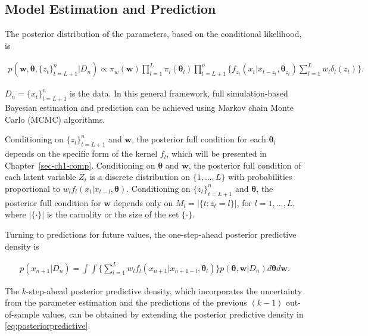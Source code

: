 \documentclass[
  letterpaper,
  double,
  12pt,
  1.0in]{beavtex}
\begin{document}
\subsection{Model Estimation and
Prediction}\label{estimationvalidationprediction}

The posterior distribution of the parameters, based on the conditional
likelihood, is

\begin{equation}
\begin{split}
p(\boldsymbol{w}, \boldsymbol{\theta}, {\{z_t\}}_{t=L+1}^n | D_n) \propto \pi_w(\boldsymbol{w}) \prod_{l=1}^L \pi_l(\boldsymbol{\theta}_l) 
\prod_{t=L+1}^n \Biggl\{ f_{z_t} (x_t | x_{t-z_t}, \boldsymbol{\theta}_{z_t}) \sum_{l=1}^L w_l \delta_l(z_t) \Biggl\}.
\end{split}
\end{equation}

\(D_n = {\{x_t\}}_{t=L+1}^n\) is the data. In this general framework,
full simulation-based Bayesian estimation and prediction can be achieved
using Markov chain Monte Carlo (MCMC) algorithms.

Conditioning on \({\{z_t\}}_{t=L+1}^n\) and \(\boldsymbol{w}\), the
posterior full condition for each \(\boldsymbol{\theta}_l\) depends on
the specific form of the kernel \(f_l\), which will be presented in
Chapter~\ref{sec-ch1-comp}. Conditioning on \(\boldsymbol{\theta}\) and
\(\boldsymbol{w}\), the posterior full condition of each latent variable
\(Z_t\) is a discrete distribution on \(\{1, ..., L\}\) with
probabilities proportional to
\(w_l f_l(x_t | x_{t-l}, \boldsymbol{\theta})\). Conditioning on
\({\{z_t\}}_{t=L+1}^n\) and \(\boldsymbol{\theta}\), the posterior full
condition for \(\boldsymbol{w}\) depends only on
\(M_l = |\{ t: z_t = l \}|\), for \(l = 1,..., L\), where
\(|\{ \cdot \}|\) is the carnality or the size of the set
\(\{ \cdot \}\).

Turning to predictions for future values, the one-step-ahead posterior
predictive density is

\begin{equation}
\begin{split}
\label{eq:posteriorpredictive}
p(x_{n+1} | D_n) = \int \int \Biggl\{ \sum_{l=1}^L w_l f_l (x_{n+1} | x_{n + 1 - l}, \boldsymbol{\theta}_l) \Biggl\} 
p(\boldsymbol{\theta} , \boldsymbol{w} | D_n) d \boldsymbol{\theta} d \boldsymbol{w}.
\end{split}
\end{equation}

The \(k\)-step-ahead posterior predictive density, which incorporates
the uncertainty from the parameter estimation and the predictions of the
previous \((k-1)\) out-of-sample values, can be obtained by extending
the posterior predictive density in \ref{eq:posteriorpredictive}.
\end{document}
